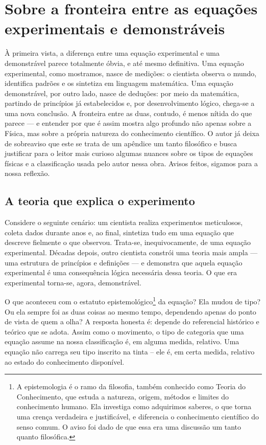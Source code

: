 
\chapter{Sobre a fronteira entre as equações experimentais e demonstráveis} \label{apendice-eqs-exp-vs-dem}



À primeira vista, a diferença entre uma equação experimental e uma
demonstrável parece totalmente óbvia, e até mesmo definitiva. Uma equação experimental, como mostramos, nasce
de medições: o cientista observa o mundo, identifica padrões e os sintetiza
em linguagem matemática. Uma equação demonstrável, por outro lado, nasce de deduções: por meio da matemática, partindo de princípios já estabelecidos e, por desenvolvimento
lógico, chega-se a uma nova conclusão. A fronteira entre as duas, contudo,
é menos nítida do que parece --- e entender por que é assim mostra algo
profundo não apenas sobre a Física, mas sobre a própria natureza do
conhecimento científico. O autor já deixa de sobreaviso que este se trata de um apêndice um tanto filosófico e busca justificar para o leitor mais curioso algumas nuances sobre os tipos de equações físicas e a classificação usada pelo autor nessa obra. Avisos feitos, sigamos para a nossa reflexão.


\section*{A teoria que explica o experimento}

Considere o seguinte cenário: um cientista realiza experimentos
meticulosos, coleta dados durante anos e, ao final, sintetiza tudo em uma
equação que descreve fielmente o que observou. Trata-se,
inequivocamente, de uma equação experimental. Décadas depois, outro
cientista constrói uma teoria mais ampla --- uma estrutura de princípios
e definições --- e demonstra que aquela equação experimental é uma
consequência lógica necessária dessa teoria. O que era experimental
torna-se, agora, demonstrável.

O que aconteceu com o estatuto epistemológico\footnote{A epistemologia é o ramo da filosofia, também conhecido como Teoria do Conhecimento, que estuda a natureza, origem, métodos e limites do conhecimento humano. Ela investiga como adquirimos saberes, o que torna uma crença verdadeira e justificável, e diferencia o conhecimento científico do senso comum. O aviso foi dado de que essa era uma discussão um tanto quanto filosófica.} da equação? Ela mudou de
tipo? Ou ela sempre foi as duas coisas ao mesmo tempo, dependendo apenas
do ponto de vista de quem a olha? A resposta honesta é: depende do
referencial histórico e teórico que se adota. Assim como o movimento, o tipo de categoria que uma equação assume na nossa classificação é, em alguma medida, relativo. Uma equação não carrega
seu tipo inscrito na tinta -- ele é, em certa medida, relativo ao
estado do conhecimento disponível.



